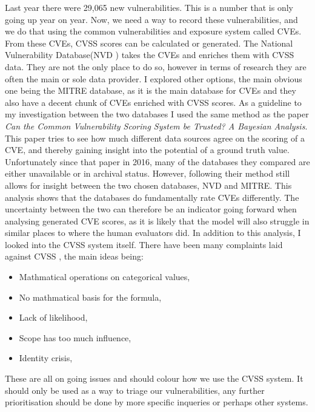 \documentclass[12pt]{article}
\begin{document}
Last year there were 29,065 new vulnerabilities. This is a number that is only going up year on
year. Now, we need a way to record these vulnerabilities, and we do that using the common
vulnerabilities and exposure system called CVEs. From these CVEs, CVSS scores can be calculated or
generated. The National Vulnerability Database(NVD \cite{NVD}) takes the CVEs and enriches them with
CVSS data. They are not the only place to do so, however in terms of research they are often the
main or sole data provider. \cite{costa} \cite{nvd_example1} \cite{nvd_example2} I explored other
options, the main obvious one being the MITRE \cite{MITRE} database, as it is the main database for
CVEs and they also have a decent chunk of CVEs enriched with CVSS scores. As a guideline to my
investigation between the two databases I used the same method as the paper \textit{Can the Common
	Vulnerability Scoring System be Trusted? A Bayesian Analysis}. \cite{bayes} This paper tries to see
how much different data sources agree on the scoring of a CVE, and thereby gaining insight into the
potential of a ground truth value. Unfortunately since that paper in 2016, many of the databases
they compared are either unavailable or in archival status. However, following their method still
allows for insight between the two chosen databases, NVD and MITRE. This analysis shows that the
databases do fundamentally rate CVEs differently. The uncertainty between the two can therefore be
an indicator going forward when analysing generated CVE scores, as it is likely that the model will
also struggle in similar places to where the human evaluators did. In addition to this analysis, I
looked into the CVSS system itself. There have been many complaints laid against
CVSS \cite{ubiquitous} \cite{improving_cvss} \cite{time_to_change_cvss}, the main ideas being:

\begin{itemize}
	\item Mathmatical operations on categorical values,
	\item No mathmatical basis for the formula,
	\item Lack of likelihood,
	\item Scope has too much influence,
	\item Identity crisis,
\end{itemize}

These are all on going issues and should colour how we use the CVSS system. It should only be used as a way to triage our vulnerabilities, any further
prioritisation should be done by more specific inqueries or perhaps other systems.
\end{document}
